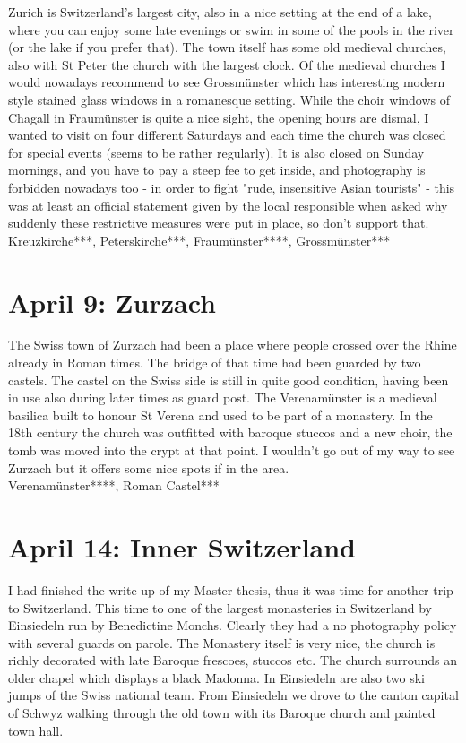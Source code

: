 Zurich is Switzerland's largest city, also in a nice setting at the end of a lake, where you can enjoy some late evenings or swim in some of the pools in the river (or the lake if you prefer that). The town itself has some old medieval churches, also with St Peter the church with the largest clock. Of the medieval churches I would nowadays recommend to see Grossm\"unster which has interesting modern style stained glass windows in a romanesque setting. While the choir windows of Chagall in Fraum\"unster is quite a nice sight, the opening hours are dismal, I wanted to visit on four different Saturdays and each time the church was closed for special events (seems to be rather regularly). It is also closed on Sunday mornings, and you have to pay a steep fee to get inside, and photography is forbidden nowadays too - in order to fight "rude, insensitive Asian tourists" - this was at least an official statement given by the local responsible when asked why suddenly these restrictive measures were put in place, so don't support that.\\

Kreuzkirche***, Peterskirche***, Fraum\"unster****, Grossm\"unster***

\section{April 9: Zurzach}
\label{2007:Zurzach}

The Swiss town of Zurzach had been a place where people crossed over the Rhine already in Roman times. The bridge of that time had been guarded by two castels. The castel on the Swiss side is still in quite good condition, having been in use also during later times as guard post. The Verenam\"unster is a medieval basilica built to honour St Verena and used to be part of a monastery. In the 18th century the church was outfitted with baroque stuccos and a new choir, the tomb was moved into the crypt at that point. I wouldn't go out of my way to see Zurzach but it offers some nice spots if in the area.\\

Verenam\"unster****, Roman Castel***

\section{April 14: Inner Switzerland}
\label{2007:Switzerland}

I had finished the write-up of my Master thesis, thus it was time for another trip to Switzerland. This time to one of the largest monasteries in Switzerland by Einsiedeln run by Benedictine Monchs. Clearly they had a no photography policy with several guards on parole. The Monastery itself is very nice, the church is richly decorated with late Baroque frescoes, stuccos etc. The church surrounds an older chapel which displays a black Madonna. In Einsiedeln are also two ski jumps of the Swiss national team. From Einsiedeln we drove to the canton capital of Schwyz walking through the old town with its Baroque church and painted town hall.\\

